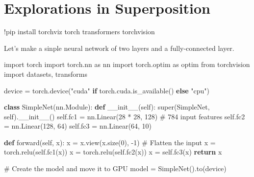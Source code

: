 \documentclass[
  letterpaper,
  DIV=11,
  numbers=noendperiod]{scrreprt}
\newenvironment{Shaded}{\begin{snugshade}}{\end{snugshade}}
\newcommand{\BuiltInTok}[1]{\textcolor[rgb]{0.00,0.23,0.31}{#1}}
\newcommand{\CommentTok}[1]{\textcolor[rgb]{0.37,0.37,0.37}{#1}}
\newcommand{\ControlFlowTok}[1]{\textcolor[rgb]{0.00,0.23,0.31}{\textbf{#1}}}
\newcommand{\DecValTok}[1]{\textcolor[rgb]{0.68,0.00,0.00}{#1}}
\newcommand{\FunctionTok}[1]{\textcolor[rgb]{0.28,0.35,0.67}{#1}}
\newcommand{\ImportTok}[1]{\textcolor[rgb]{0.00,0.46,0.62}{#1}}
\newcommand{\KeywordTok}[1]{\textcolor[rgb]{0.00,0.23,0.31}{\textbf{#1}}}
\newcommand{\NormalTok}[1]{\textcolor[rgb]{0.00,0.23,0.31}{#1}}
\newcommand{\OperatorTok}[1]{\textcolor[rgb]{0.37,0.37,0.37}{#1}}
\newcommand{\StringTok}[1]{\textcolor[rgb]{0.13,0.47,0.30}{#1}}
\newcommand{\VariableTok}[1]{\textcolor[rgb]{0.07,0.07,0.07}{#1}}
\begin{document}

\chapter{Explorations in
Superposition}\label{explorations-in-superposition}

\begin{Shaded}
\begin{Highlighting}[]
\OperatorTok{!}\NormalTok{pip install torchviz torch transformers torchvision}
\end{Highlighting}
\end{Shaded}

Let's make a sinple neural network of two layers and a fully-connected
layer.

\begin{Shaded}
\begin{Highlighting}[]
\ImportTok{import}\NormalTok{ torch}
\ImportTok{import}\NormalTok{ torch.nn }\ImportTok{as}\NormalTok{ nn}
\ImportTok{import}\NormalTok{ torch.optim }\ImportTok{as}\NormalTok{ optim}
\ImportTok{from}\NormalTok{ torchvision }\ImportTok{import}\NormalTok{ datasets, transforms}

\NormalTok{device }\OperatorTok{=}\NormalTok{ torch.device(}\StringTok{"cuda"} \ControlFlowTok{if}\NormalTok{ torch.cuda.is\_available() }\ControlFlowTok{else} \StringTok{"cpu"}\NormalTok{)}

\KeywordTok{class}\NormalTok{ SimpleNet(nn.Module):}
    \KeywordTok{def} \FunctionTok{\_\_init\_\_}\NormalTok{(}\VariableTok{self}\NormalTok{):}
        \BuiltInTok{super}\NormalTok{(SimpleNet, }\VariableTok{self}\NormalTok{).}\FunctionTok{\_\_init\_\_}\NormalTok{()}
        \VariableTok{self}\NormalTok{.fc1 }\OperatorTok{=}\NormalTok{ nn.Linear(}\DecValTok{28} \OperatorTok{*} \DecValTok{28}\NormalTok{, }\DecValTok{128}\NormalTok{)  }\CommentTok{\# 784 input features}
        \VariableTok{self}\NormalTok{.fc2 }\OperatorTok{=}\NormalTok{ nn.Linear(}\DecValTok{128}\NormalTok{, }\DecValTok{64}\NormalTok{)}
        \VariableTok{self}\NormalTok{.fc3 }\OperatorTok{=}\NormalTok{ nn.Linear(}\DecValTok{64}\NormalTok{, }\DecValTok{10}\NormalTok{)}

    \KeywordTok{def}\NormalTok{ forward(}\VariableTok{self}\NormalTok{, x):}
\NormalTok{        x }\OperatorTok{=}\NormalTok{ x.view(x.size(}\DecValTok{0}\NormalTok{), }\OperatorTok{{-}}\DecValTok{1}\NormalTok{)  }\CommentTok{\# Flatten the input}
\NormalTok{        x }\OperatorTok{=}\NormalTok{ torch.relu(}\VariableTok{self}\NormalTok{.fc1(x))}
\NormalTok{        x }\OperatorTok{=}\NormalTok{ torch.relu(}\VariableTok{self}\NormalTok{.fc2(x))}
\NormalTok{        x }\OperatorTok{=} \VariableTok{self}\NormalTok{.fc3(x)}
        \ControlFlowTok{return}\NormalTok{ x}

\CommentTok{\# Create the model and move it to GPU}
\NormalTok{model }\OperatorTok{=}\NormalTok{ SimpleNet().to(device)}
\end{Highlighting}
\end{Shaded}
\end{document}
